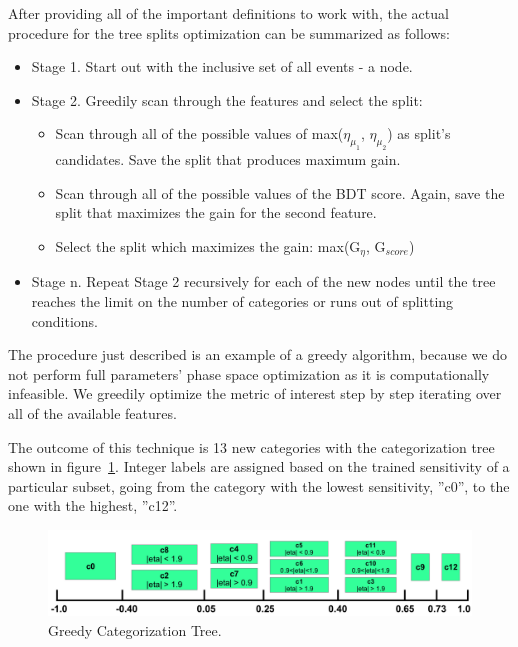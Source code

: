 After providing all of the important definitions to work with, the actual procedure for the tree splits optimization can be summarized as follows:
\begin{itemize}
  \item Stage 1. Start out with the inclusive set of all events - a node.
  \item Stage 2. Greedily scan through the features and select the split:
    \begin{itemize}
      \item Scan through all of the possible values of max($\eta_{\mu_1}$, $\eta_{\mu_2}$) as split's candidates. Save the split that produces maximum gain.
      \item Scan through all of the possible values of the BDT score. Again, save the split that maximizes the gain for the second feature.
      \item Select the split which maximizes the gain: max(G$_\eta$, G$_{score}$)
    \end{itemize}
  \item Stage n. Repeat Stage 2 recursively for each of the new nodes until the tree reaches the limit on the number of categories or runs out of splitting conditions.
\end{itemize}
The procedure just described is an example of a greedy algorithm, because we do not perform full parameters' phase space optimization as it is computationally infeasible. We greedily optimize the metric of interest step by step iterating over all of the available features.

The outcome of this technique is 13 new categories with the categorization tree shown in figure~\ref{fig:higgs_categorization_bdtcategories}. Integer labels are assigned based on the trained sensitivity of a particular subset, going from the category with the lowest sensitivity, ''c0'', to the one with the highest, ''c12''.
\begin{figure}[hbp]
  \centering
  \includegraphics[width=1.0\linewidth]{figures/bdt_cats/final_categories.png}
  \caption
   {Greedy Categorization Tree.}
  \label{fig:higgs_categorization_bdtcategories}
\end{figure}

